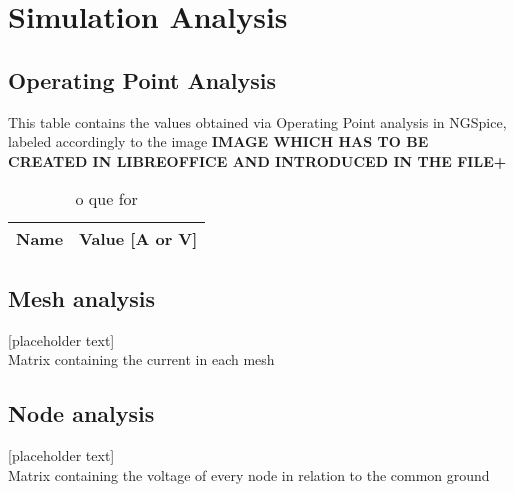 \section{Simulation Analysis}
\label{sec:simulation}

\subsection{Operating Point Analysis}

This table contains the values obtained via Operating Point analysis in NGSpice, labeled accordingly to the image \textbf{IMAGE WHICH HAS TO BE CREATED IN LIBREOFFICE AND INTRODUCED IN THE FILE+}

\begin{table}[h]
  \centering
  \begin{tabular}{|l|r|}
    \hline    
    {\bf Name} & {\bf Value [A or V]} \\ \hline
    
  \end{tabular}
  \caption{o que for}
  \label{tab:op}
\end{table}


\subsection{Mesh analysis}

[placeholder text]\\

Matrix containing the current in each mesh
\subsection{Node analysis}

[placeholder text]\\

Matrix containing the voltage of every node in relation to the common ground
